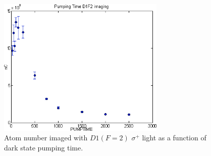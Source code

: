 \begin{figure}
  \begin{center}
    \includegraphics[width=8cm]{mf-pump.png}
  \end{center}
  \caption{Atom number imaged with $D1 (F=2)$ $\sigma^+$ light as a function of dark state pumping time.}
  \label{exp:mf-pump-time}
\end{figure}

